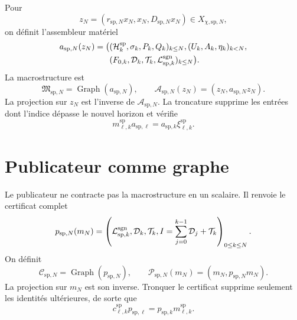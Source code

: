 Pour
\[
 z_N=(r_{\mathrm{sp},N}x_N,x_N,D_{\mathrm{sp},N}x_N)
 \in X_{\chi,\mathrm{sp},N},
\]
on définit l'assembleur matériel
\begin{equation}
\label{eq:continuo-sp-a-accion}
\begin{aligned}
 a_{\mathrm{sp},N}(z_N)=\bigl(&
 (\mathcal H_k^{\mathrm{sp}},\sigma_k,P_k,Q_k)_{k\leq N},
 (U_k,A_k,\eta_k)_{k<N},\\
 &(F_{0,k},\mathcal D_k,\mathcal T_k,
   \mathcal L^{\rm sgn}_{\mathrm{sp},k})_{k\leq N}\bigr).
\end{aligned}
\end{equation}
La macrostructure est
\begin{equation}
\label{eq:continuo-sp-m-graph}
 \mathfrak M_{\mathrm{sp},N}
 =\operatorname{Graph}(a_{\mathrm{sp},N}),
 \qquad
 \mathcal A_{\mathrm{sp},N}(z_N)
 =(z_N,a_{\mathrm{sp},N}z_N).
\end{equation}
La projection sur \(z_N\) est l'inverse de
\(\mathcal A_{\mathrm{sp},N}\). La troncature supprime les entrées dont
l'indice dépasse le nouvel horizon et vérifie
\begin{equation}
\label{eq:continuo-sp-a-naturalidad}
 m^{\mathrm{sp}}_{\ell,k}a_{\mathrm{sp},\ell}
 =a_{\mathrm{sp},k}\xi^{\mathrm{sp}}_{\ell,k}.
\end{equation}

\section{Publicateur comme graphe}

Le publicateur ne contracte pas la macrostructure en un scalaire. Il renvoie le
certificat complet
\begin{equation}
\label{eq:continuo-sp-p-accion}
 p_{\mathrm{sp},N}(m_N)
 =\left(
 \mathcal L^{\rm sgn}_{\mathrm{sp},k},
 \mathcal D_k,
 \mathcal T_k,
 I=\sum_{j=0}^{k-1}\mathcal D_j+\mathcal T_k
 \right)_{0\leq k\leq N}.
\end{equation}
On définit
\begin{equation}
\label{eq:continuo-sp-c-graph}
 \mathcal C_{\mathrm{sp},N}
 =\operatorname{Graph}(p_{\mathrm{sp},N}),
 \qquad
 \mathcal P_{\mathrm{sp},N}(m_N)
 =(m_N,p_{\mathrm{sp},N}m_N).
\end{equation}
La projection sur \(m_N\) est son inverse. Tronquer le certificat supprime seulement
les identités ultérieures, de sorte que
\begin{equation}
\label{eq:continuo-sp-p-naturalidad}
 c^{\mathrm{sp}}_{\ell,k}p_{\mathrm{sp},\ell}
 =p_{\mathrm{sp},k}m^{\mathrm{sp}}_{\ell,k}.
\end{equation}

